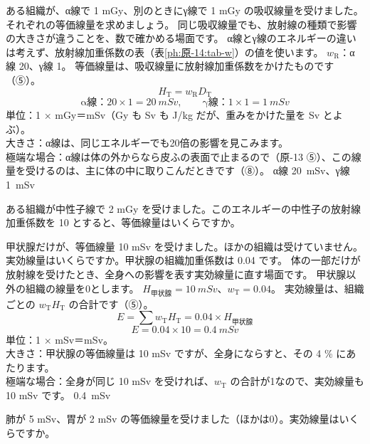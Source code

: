 \label{ph:原-14:ex3}
\begin{phreidai}[α線とγ線の等価線量]
ある組織が、α線で 1 mGy、別のときにγ線で 1 mGy の吸収線量を受けました。それぞれの等価線量を求めましょう。
\phbamen
同じ吸収線量でも、放射線の種類で影響の大きさが違うことを、数で確かめる場面です。
\phmushi
α線とγ線のエネルギーの違いは考えず、放射線加重係数の表（表\ref{ph:原-14:tab-w}）の値を使います。
\phzu
$w_{\mathrm R}$：α線 20、γ線 1。
\phriyu
等価線量は、吸収線量に放射線加重係数をかけたものです（⑤）。
\phtateru
\[ H_{\mathrm T}=w_{\mathrm R}D_{\mathrm T} \]
\phtoku
\[ \text{α線：}20\times1=\qty{20}{mSv},\qquad \text{γ線：}1\times1=\qty{1}{mSv} \]
\phtashikame
単位：1 × mGy＝mSv（Gy も Sv も J/kg だが、重みをかけた量を Sv とよぶ）。\\
大きさ：α線は、同じエネルギーでも20倍の影響を見こみます。\\
極端な場合：α線は体の外からなら皮ふの表面で止まるので（原-13 ⑤）、この線量を受けるのは、主に体の中に取りこんだときです（⑧）。
\kotae α線 \qty{20}{mSv}、γ線 \qty{1}{mSv}
\end{phreidai}
\begin{jibun}
ある組織が中性子線で 2 mGy を受けました。このエネルギーの中性子の放射線加重係数を 10 とすると、等価線量はいくらですか。
\end{jibun}

\label{ph:原-14:ex4}
\begin{phreidai}[甲状腺の等価線量から実効線量へ]
甲状腺だけが、等価線量 10 mSv を受けました。ほかの組織は受けていません。実効線量はいくらですか。甲状腺の組織加重係数は 0.04 です。
\phbamen
体の一部だけが放射線を受けたとき、全身への影響を表す実効線量に直す場面です。
\phmushi
甲状腺以外の組織の線量を0とします。
\phzu
$H_{\text{甲状腺}}=\qty{10}{mSv}$、$w_{\mathrm T}=0.04$。
\phriyu
実効線量は、組織ごとの $w_{\mathrm T}H_{\mathrm T}$ の合計です（⑤）。
\phtateru
\[ E=\textstyle\sum w_{\mathrm T}H_{\mathrm T}=0.04\times H_{\text{甲状腺}} \]
\phtoku
\[ E=0.04\times10=\qty{0.4}{mSv} \]
\phtashikame
単位：1 × mSv＝mSv。\\
大きさ：甲状腺の等価線量は 10 mSv ですが、全身にならすと、その 4 \% にあたります。\\
極端な場合：全身が同じ 10 mSv を受ければ、$w_{\mathrm T}$ の合計が1なので、実効線量も 10 mSv です。
\kotae \qty{0.4}{mSv}
\end{phreidai}
\begin{jibun}
肺が 5 mSv、胃が 2 mSv の等価線量を受けました（ほかは0）。実効線量はいくらですか。
\end{jibun}

